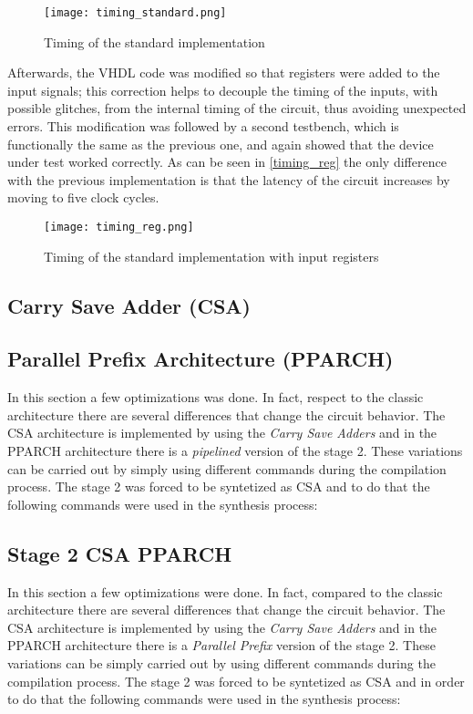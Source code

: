 \begin{figure}[h]
	\center
	\texttt{[image: timing\_standard.png]}
	\caption{Timing of the standard implementation}
	\label{fig:timing_standard}
\end{figure}

Afterwards, the VHDL code was modified so that registers were added to the input signals; this correction helps to decouple the timing of the inputs, with possible glitches, from the internal timing of the circuit, thus avoiding unexpected errors.
This modification was followed by a second testbench, which is functionally the same as the previous one, and again showed that the device under test worked correctly. As can be seen in \autoref{timing_reg} the only difference with the previous implementation is that the latency of the circuit increases by moving to five clock cycles.

\begin{figure}[h]
	\center
	\texttt{[image: timing\_reg.png]}
	\caption{Timing of the standard implementation with input registers}
	\label{fig:timing_reg}
\end{figure}



\subsection{Carry Save Adder (CSA)}
\subsection{Parallel Prefix Architecture (PPARCH)}
In this section a few optimizations was done. In fact, respect to the classic architecture there are several differences that change the circuit behavior. The CSA architecture is implemented by using the \textit{Carry Save Adders} and in the PPARCH architecture there is a \textit{pipelined} version of the stage 2. These variations can be carried out by simply using different commands during the compilation process. The stage 2 was forced to be syntetized as CSA and to do that the following commands were used in the synthesis process:

\subsection{Stage 2 CSA PPARCH}
In this section a few optimizations were done. In fact, compared to the classic architecture there are several differences that change the circuit behavior. The CSA architecture is implemented by using the \textit{Carry Save Adders} and in the PPARCH architecture there is a \textit{Parallel Prefix} version of the stage 2. These variations can be simply carried out by using different commands during the compilation process. The stage 2 was forced to be syntetized as CSA and in order to do that the following commands were used in the synthesis process:

